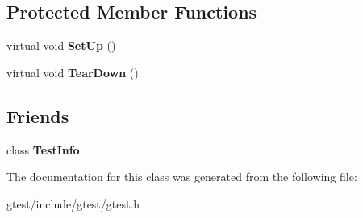 \subsection*{Protected Member Functions}
\begin{DoxyCompactItemize}
\item 
\mbox{\label{classtesting_1_1Test_a8b38992669fb844864807cf32e416853}} 
virtual void {\bfseries Set\+Up} ()
\item 
\mbox{\label{classtesting_1_1Test_aab3c02c9f81afe1357adfc45afccd474}} 
virtual void {\bfseries Tear\+Down} ()
\end{DoxyCompactItemize}
\subsection*{Friends}
\begin{DoxyCompactItemize}
\item 
\mbox{\label{classtesting_1_1Test_a4c49c2cdb6c328e6b709b4542f23de3c}} 
class {\bfseries Test\+Info}
\end{DoxyCompactItemize}


The documentation for this class was generated from the following file\+:\begin{DoxyCompactItemize}
\item 
gtest/include/gtest/gtest.\+h\end{DoxyCompactItemize}
